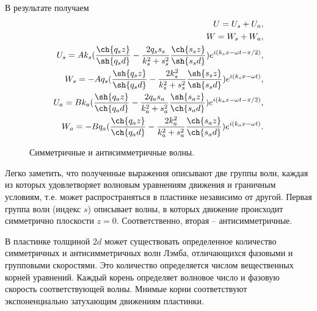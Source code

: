 В результате получаем
\begin{eqnarray}
U = U_s + U_a, \nonumber\\
W = W_s + W_a, \nonumber\\
U_s = A k_s( \frac{\ch{q_s z}}{\sh{q_s d}} - \frac{2 q_s s_s}{k_s^2+s_s^2} \frac{\ch{s_s z}}{\sh{s_s d}} ) e^{i(k_s x - \omega t - \pi/2)}, \nonumber\\
W_s = - A q_s( \frac{\sh{q_s z}}{\sh{q_s d}} - \frac{2 k_s^2}{k_s^2+s_s^2} \frac{\sh{s_s z}}{\sh{s_s d}} ) e^{i(k_s x - \omega t)}, \nonumber\\
U_a = B k_a( \frac{\sh{q_a z}}{\ch{q_a d}} - \frac{2 q_a s_a}{k_a^2+s_a^2} \frac{\sh{s_a z}}{\ch{s_a d}} ) e^{i(k_a x - \omega t - \pi/2)}, \nonumber\\
W_a = - B q_a( \frac{\ch{q_a z}}{\ch{q_a d}} - \frac{2 k_a^2}{k_a^2+s_a^2} \frac{\ch{s_a z}}{\ch{s_a d}} ) e^{i(k_a x - \omega t)}.
\end{eqnarray}

\begin{figure}[h]
\caption{Симметричные и антисимметричные волны.}
\end{figure}

Легко заметить, что полученные выражения описывают две группы волн, каждая из которых удовлетворяет волновым уравнениям движения и граничным условиям, т.е. может распространяться в пластинке независимо от другой. Первая группа волн (индекс $s$) описывает волны, в которых движение происходит симметрично плоскости $z = 0$. Соответственно, вторая – антисимметричные. 

В пластинке толщиной $2d$ может существовать определенное количество симметричных и антисимметричных волн Лэмба, отличающихся фазовыми и групповыми скоростями. Это количество определяется числом вещественных корней уравнений. Каждый корень определяет волновое число и фазовую скорость соответствующей волны. Мнимые корни соответствуют экспоненциально затухающим движениям пластинки.


